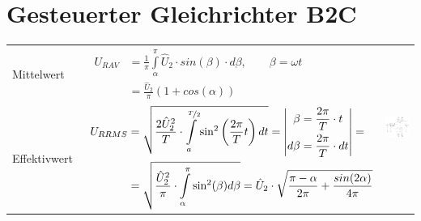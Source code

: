 \section{Gesteuerter Gleichrichter B2C}

\begin{tabu}{|l|l|p{0.3\textwidth}}
  Mittelwert 
  	&\ $\begin{aligned}
  			U_{R AV} &= \frac{1}{\pi}\int\limits_{\alpha}^{\pi}\hat{U}_{2} \cdot sin(\beta) \cdot d\beta, \qquad \beta = \omega t\\
  						&= \frac{\hat{U}_{2}}{\pi}(1 + cos(\alpha))
  		\end{aligned}$ 
  		& \\
  Effektivwert 
  	&\ $\begin{aligned}
  		U_{R RMS} &= \sqrt{\frac{2 \hat{U}_{2}^2}{T}\cdot \int\limits_{a}^{\nicefrac{T}{2}} \sin^2\left( \frac{2\pi}{T} t\right) dt} = \left| \begin{aligned} \beta &= \frac{2\pi}{T}\cdot t \\ d\beta &= \frac{2\pi}{T} \cdot dt\end{aligned} \right| =\\
          &= \sqrt{\frac{\hat{U}_{2}^2}{\pi}\cdot\int\limits_{\alpha}^{\pi} \sin^2(\beta)d\beta} = \hat{U}_{2} \cdot \sqrt{\frac{\pi-\alpha}{2\pi}+\frac{sin(2\alpha)}{4\pi}}
  		\end{aligned}$ &\\
\end{tabu}